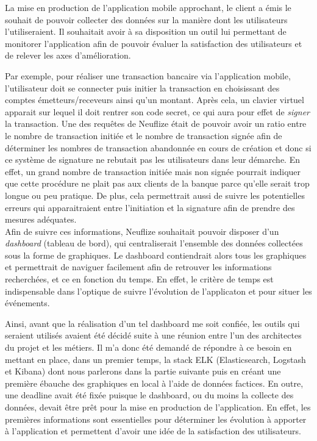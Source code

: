 	La mise en production de l'application mobile approchant, le client a émis le souhait de pouvoir collecter des données sur la manière dont les utilisateurs l'utiliseraient. Il souhaitait avoir à sa disposition un outil lui permettant de monitorer l'application afin de pouvoir évaluer la satisfaction des utilisateurs et de relever les axes d'amélioration. 
	
	Par exemple, pour réaliser une transaction bancaire via l'application mobile, l'utilisateur doit se connecter puis initier la transaction en choisissant des comptes émetteurs/receveurs ainsi qu'un montant. Après cela, un clavier virtuel apparait sur lequel il doit rentrer son code secret, ce qui aura pour effet de \textit{signer} la transaction. Une des requêtes de Neuflize était de pouvoir avoir un ratio entre le nombre de transaction initiée et le nombre de transaction signée afin de déterminer les nombres de transaction abandonnée en cours de création et donc si ce système de signature ne rebutait pas les utilisateurs dans leur démarche. En effet, un grand nombre de transaction initiée mais non signée pourrait indiquer que cette procédure ne plait pas aux clients de la banque parce qu'elle serait trop longue ou peu pratique. De plus, cela permettrait aussi de suivre les potentielles erreurs qui apparaitraient entre l'initiation et la signature afin de prendre des mesures adéquates. \\
	
	Afin de suivre ces informations, Neuflize souhaitait pouvoir disposer d'un \textit{dashboard} (tableau de bord), qui centraliserait l'ensemble des données collectées sous la forme de graphiques. Le dashboard contiendrait alors tous les graphiques et permettrait de naviguer facilement afin de retrouver les informations recherchées, et ce en fonction du temps. En effet, le critère de temps est indispensable dans l'optique de suivre l'évolution de l'applicaton et pour situer les événements.
	
	Ainsi, avant que la réalisation d'un tel dashboard me soit confiée, les outils qui seraient utilisés avaient été décidé suite à une réunion entre l'un des architectes du projet et les métiers. Il m'a donc été demandé de répondre à ce besoin en mettant en place, dans un premier temps, la stack ELK (Elasticsearch, Logstash et Kibana) dont nous parlerons dans la partie suivante puis en créant une première ébauche des graphiques en local à l'aide de données factices. En outre, une deadline avait été fixée puisque le dashboard, ou du moins la collecte des données, devait être prêt pour la mise en production de l'application. En effet, les premières informations sont essentielles pour déterminer les évolution à apporter à l'application et permettent d'avoir une idée de la satisfaction des utilisateurs. \\
	
